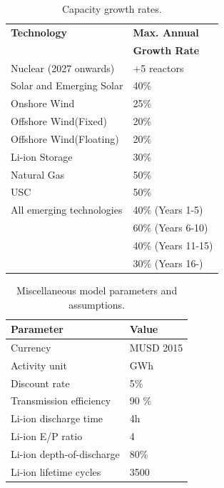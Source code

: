 \begin{table}[!ht]
	\caption{Capacity growth rates.}
	\vspace{0.1in}
	\begin{tabularx}{\textwidth}{p{} p{}}
		\hline
\textbf{Technology} & \textbf{Max. Annual} \\
  & \textbf{Growth Rate}   \\
\hline
Nuclear (2027 onwards) & +5 reactors \\
Solar and Emerging Solar \cite{irena_renewable_2020} & 40\%  \\
Onshore Wind \cite{irena_renewable_2020} & 25\% \\
Offshore Wind(Fixed) \cite{irena_renewable_2020} & 20\% \\
Offshore Wind(Floating) \cite{irena_renewable_2020} & 20\% \\
Li-ion Storage & 30\% \\
Natural Gas &  50\% \\
\gls{USC} & 50\% \\
All emerging technologies & 40\% (Years 1-5) \\
& 60\% (Years 6-10) \\
 & 40\% (Years 11-15) \\
 & 30\% (Years 16-) \\
\hline 
\end{tabularx}
\label{growrate}
\end{table}

\begin{table}[!ht]
	\caption{Miscellaneous model parameters and assumptions.}
	\vspace{0.1in}
	\begin{tabularx}{\textwidth}{p{} p{}}
		\hline
\textbf{Parameter} & \textbf{Value} \\
\hline
Currency & MUSD 2015 \\
Activity unit & GWh\\
Discount rate & 5\% \\
Transmission efficiency & 90 \% \\
Li-ion discharge time \cite{mongird_energy_2019} & 4h \\
Li-ion E/P ratio \cite{mongird_energy_2019} & 4  \\
Li-ion depth-of-discharge \cite{mongird_energy_2019} & 80\% \\
Li-ion lifetime cycles \cite{mongird_energy_2019} & 3500  \\
\hline 
	\end{tabularx}
\label{misc-assump}
\end{table}